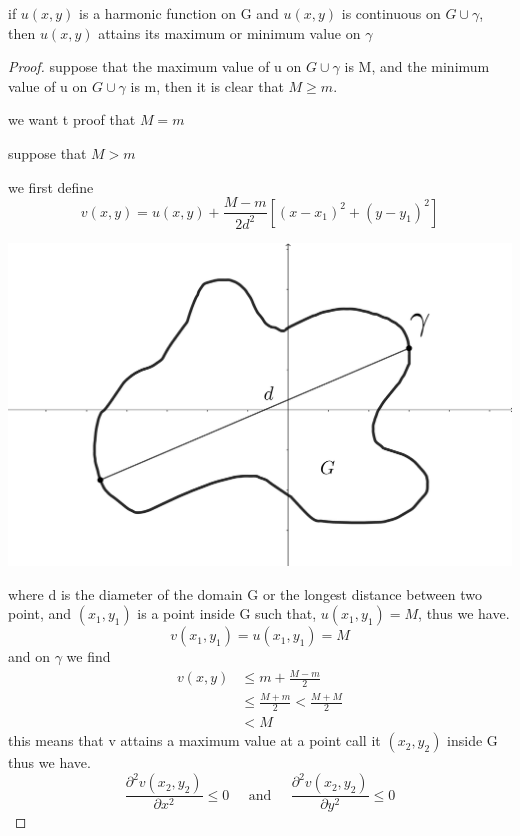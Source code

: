 \documentclass[]{article}
\begin{document}
\begin{theorem}
    if $u(x,y)$ is a harmonic function on G and $u(x,y)$ is continuous on $G \cup \gamma$, then $u(x,y)$ attains its maximum or minimum value on $\gamma$    
\end{theorem}
\begin{proof}
    suppose that the maximum value of u on $G \cup \gamma$ is M, and the minimum value of u on $G \cup \gamma$ is m, then it is clear that $M \geq m$.
    \par
    we want t proof that $M = m$ 
    \par
    suppose that $M > m$ 
    \par
    we first define
    \[
        v(x,y) = u(x,y) + \frac{M-m}{2d^2}\left[(x-x_{1})^2+(y-y_{1})^2\right]    
    \]
    \begin{center}
        \includegraphics[scale=0.1]{diameter.png}
    \end{center}
    where d is the diameter of the domain G or the longest distance between two point, 
    and $(x_1,y_1)$ is a point inside G such that, $u(x_1,y_1) = M$, thus we have.
    \[
        v(x_1,y_1) = u(x_1,y_1) = M    
    \]
    and on $\gamma$ we find
    \begin{align*}
        v(x,y) &\leq m+\frac{M-m}{2}
        \\
        &\leq \frac{M+m}{2} < \frac{M+M}{2}
        \\
        &< M
    \end{align*}
    this means that v attains a maximum value at a point call it $(x_2,y_2)$ inside G thus we have.
    \[
        \frac{\partial^2 v(x_2,y_2)}{\partial x^2} \leq 0 \;\;\;\;\; \text{and} \;\;\;\;\; \frac{\partial^2 v(x_2,y_2)}{\partial y^2} \leq 0    
\]
\end{proof}
\end{document}
